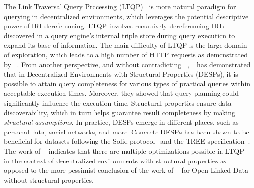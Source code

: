 The Link Traversal Query Processing (LTQP)~\cite{Hartig2012} is more natural paradigm for querying in decentralized environments,
which leverages the potential descriptive power of IRI dereferencing.
LTQP involves recursively dereferencing IRIs discovered in a query engine's internal triple store during query execution to expand its base of information.
The main difficulty of LTQP is the large domain of exploration, which leads to a high number of HTTP requests as demonstrated by \citeauthor{hartig2016walking}~\cite{hartig2016walking}.
From another perspective, and without contradicting \citeauthor{hartig2016walking}~\cite{hartig2016walking}, \citeauthor{Taelman2023}~\cite{Taelman2023} has demonstrated that in Decentralized Environments with Structural Properties (DESPs),
it is possible to attain query completeness for various types of practical queries within acceptable execution times.
Moreover, they showed that query planning could significantly influence the execution time.
Structural properties ensure data discoverability, which in turn helps guarantee result completeness by making \emph{structural assumptions}.
In practice, DESPs emerge in different places, such as personal data, social networks, and more.
Concrete DESPs has been shown to be beneficial for datasets following the Solid protocol~\cite{Taelman2023} and the TREE specification~\cite{tam_iswc_traversalsensortree_2024}.
The work of \citeauthor{Taelman2023}~\cite{Taelman2023} indicates that there are multiple optimizations possible in LTQP in the context of decentralized environments with structural properties as opposed to the
more pessimist conclusion of the work of \citeauthor{hartig2016walking}~\cite{hartig2016walking} for Open Linked Data without structural properties.

